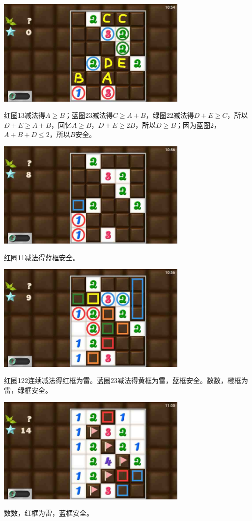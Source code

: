 \subsection{} %
\begin{center}
    \includegraphics[width=0.7\textwidth]{puzzlelow/183-1.jpg}
\end{center}
红圈13减法得$A\ge B$；蓝圈23减法得$C\ge A+B$，绿圈22减法得$D+E\ge C$，所以$D+E\ge A+B$，回忆$A\ge B$，$D+E\ge 2B$，所以$D\ge B$；因为蓝圈2，$A+B+D\le 2$，所以$B$安全。
\begin{center}
    \includegraphics[width=0.7\textwidth]{puzzlelow/183-2.jpg}
\end{center}
红圈11减法得蓝框安全。
\begin{center}
    \includegraphics[width=0.7\textwidth]{puzzlelow/183-3.jpg}
\end{center}
红圈122连续减法得红框为雷。蓝圈23减法得黄框为雷，蓝框安全。数数，橙框为雷，绿框安全。
\begin{center}
    \includegraphics[width=0.7\textwidth]{puzzlelow/183-4.jpg}
\end{center}
数数，红框为雷，蓝框安全。

